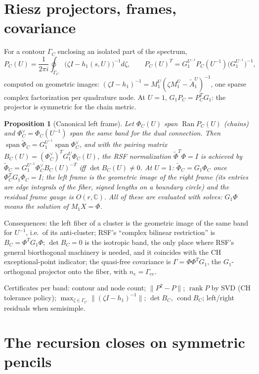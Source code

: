 \documentclass[11pt]{article}
\theoremstyle{definition}
\theoremstyle{plain}
\newtheorem{proposition}{Proposition}[section]
\theoremstyle{remark}
\newcommand{\C}{\mathbb{C}}
\newcommand{\rank}{\operatorname{rank}}
\newcommand{\Ran}{\operatorname{Ran}}
\newcommand{\Tr}{^{T}}
\newcommand{\At}{\widetilde{A}}
\begin{document}
\section{Riesz projectors, frames, covariance}\label{sec:frames}

For a contour \(\Gamma_C\) enclosing an isolated part of the spectrum,
\[
P_C(U)=\frac{1}{2\pi i}\oint_{\Gamma_C}\big(\zeta I-h_1(s,U)\big)^{-1}d\zeta,\qquad
P_C(U)\Tr=G_1^{U^{-1}}P_C(U^{-1})\big(G_1^{U^{-1}}\big)^{-1},
\]
computed on geometric images: \((\zeta I-h_1)^{-1}=M_1^{U}(\zeta M_1^{U}-\At_1^{U})^{-1}\), one sparse complex factorization per quadrature node. At \(U=1\), \(G_1P_C=P_C\Tr G_1\): the projector is symmetric for the chain metric.

\begin{proposition}[Canonical left frame]\label{prop:frames}
Let \(\Phi_C(U)\) span \(\Ran P_C(U)\) (chains) and \(\Phi_C^{\vee}=\Phi_C(U^{-1})\) span the same band for the dual connection. Then \(\operatorname{span}\widetilde\Phi_C=G_1^{U^{-1}}\operatorname{span}\Phi_C^{\vee}\), and with the pairing matrix \(B_C(U)=(\Phi_C^{\vee})\Tr G_1^{U}\Phi_C(U)\), the RSF normalization \(\widetilde\Phi\Tr\Phi=I\) is achieved by \(\widetilde\Phi_C=G_1^{U^{-1}}\Phi_C^{\vee}B_C(U)^{-T}\) iff \(\det B_C(U)\ne0\). At \(U=1\): \(\widetilde\Phi_C=G_1\Phi_C\) once \(\Phi_C\Tr G_1\Phi_C=I\); the left frame is the geometric image of the right frame (its entries are edge integrals of the fiber, signed lengths on a boundary circle) and the residual frame gauge is \(O(r,\C)\). All of these are evaluated with solves: \(G_1\Phi\) means the solution of \(M_1X=\Phi\).
\end{proposition}
Consequences: the left fiber of a cluster is the geometric image of the same band for \(U^{-1}\), i.e.\ of its anti-cluster; RSF's ``complex bilinear restriction'' is \(B_C=\Phi\Tr G_1\Phi\); \(\det B_C=0\) is the isotropic band, the only place where RSF's general biorthogonal machinery is needed, and it coincides with the CH exceptional-point indicator; the quasi-free covariance is \(\Gamma=\Phi\Phi\Tr G_1\), the \(G_1\)-orthogonal projector onto the fiber, with \(n_e=\Gamma_{ee}\).

Certificates per band: contour and node count; \(\|P^2-P\|\); \(\rank P\) by SVD (CH tolerance policy); \(\max_{\zeta\in\Gamma_C}\|(\zeta I-h_1)^{-1}\|\); \(\det B_C\), \(\operatorname{cond}B_C\); left/right residuals when semisimple.

\section{The recursion closes on symmetric pencils}\label{sec:recursion}
\end{document}
